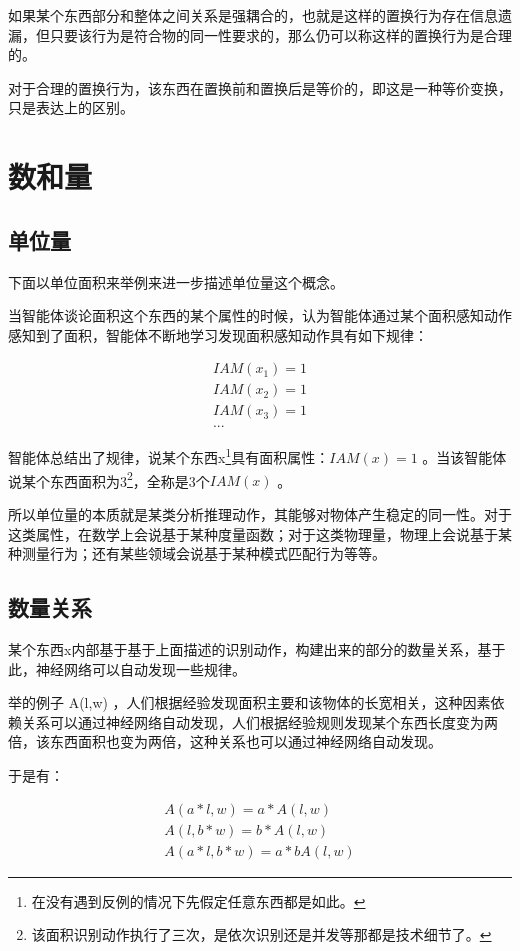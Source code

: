 \documentclass[12pt,oneside]{book}
\begin{document}
如果某个东西部分和整体之间关系是强耦合的，也就是这样的置换行为存在信息遗漏，但只要该行为是符合物的同一性要求的，那么仍可以称这样的置换行为是合理的。

对于合理的置换行为，该东西在置换前和置换后是等价的，即这是一种等价变换，只是表达上的区别。


\section{数和量}
\subsection{单位量}
下面以单位面积来举例来进一步描述单位量这个概念。

当智能体谈论面积这个东西的某个属性的时候，认为智能体通过某个面积感知动作感知到了面积，智能体不断地学习发现面积感知动作具有如下规律：

\begin{align*}
IAM(x_1)=1\\
IAM(x_2)=1\\
IAM(x_3)=1\\
...
\end{align*}

智能体总结出了规律，说某个东西x\footnote{在没有遇到反例的情况下先假定任意东西都是如此。}具有面积属性：$IAM(x)=1$ 。当该智能体说某个东西面积为3\footnote{该面积识别动作执行了三次，是依次识别还是并发等那都是技术细节了。}，全称是3个$IAM(x)$ 。

所以单位量的本质就是某类分析推理动作，其能够对物体产生稳定的同一性。对于这类属性，在数学上会说基于某种度量函数；对于这类物理量，物理上会说基于某种测量行为；还有某些领域会说基于某种模式匹配行为等等。


\subsection{数量关系}
某个东西x内部基于基于上面描述的识别动作，构建出来的部分的数量关系，基于此，神经网络可以自动发现一些规律。

\cite{烧掉数学书} 举的例子 A(l,w) ，人们根据经验发现面积主要和该物体的长宽相关，这种因素依赖关系可以通过神经网络自动发现，人们根据经验规则发现某个东西长度变为两倍，该东西面积也变为两倍，这种关系也可以通过神经网络自动发现。

于是有：

\begin{align*}
A(a*l, w) = a*A(l,w)\\
A(l, b*w) = b*A(l,w)\\
A(a*l, b*w) = a*b A(l, w) 
\end{align*}
\end{document}
